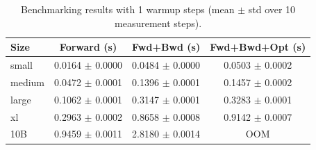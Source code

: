 \begin{table}
\caption{Benchmarking results with 1 warmup steps (mean $\pm$ std over 10 measurement steps).}
\label{tab:benchmarking_warmup1}
\begin{tabular}{lccc}
\toprule
Size & Forward (s) & Fwd+Bwd (s) & Fwd+Bwd+Opt (s) \\
\midrule
small & 0.0164 $\pm$ 0.0000 & 0.0484 $\pm$ 0.0000 & 0.0503 $\pm$ 0.0002 \\
medium & 0.0472 $\pm$ 0.0001 & 0.1396 $\pm$ 0.0001 & 0.1457 $\pm$ 0.0002 \\
large & 0.1062 $\pm$ 0.0001 & 0.3147 $\pm$ 0.0001 & 0.3283 $\pm$ 0.0001 \\
xl & 0.2963 $\pm$ 0.0002 & 0.8658 $\pm$ 0.0008 & 0.9142 $\pm$ 0.0007 \\
10B & 0.9459 $\pm$ 0.0011 & 2.8180 $\pm$ 0.0014 & OOM \\
\bottomrule
\end{tabular}
\end{table}
